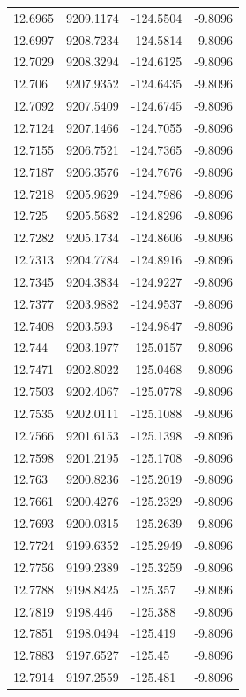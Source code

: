 \begin{table}[H]
\begin{tabular}{llll}
12.6965 & 9209.1174 & -124.5504 & -9.8096 \\
12.6997 & 9208.7234 & -124.5814 & -9.8096 \\
12.7029 & 9208.3294 & -124.6125 & -9.8096 \\
12.706 & 9207.9352 & -124.6435 & -9.8096 \\
12.7092 & 9207.5409 & -124.6745 & -9.8096 \\
12.7124 & 9207.1466 & -124.7055 & -9.8096 \\
12.7155 & 9206.7521 & -124.7365 & -9.8096 \\
12.7187 & 9206.3576 & -124.7676 & -9.8096 \\
12.7218 & 9205.9629 & -124.7986 & -9.8096 \\
12.725 & 9205.5682 & -124.8296 & -9.8096 \\
12.7282 & 9205.1734 & -124.8606 & -9.8096 \\
12.7313 & 9204.7784 & -124.8916 & -9.8096 \\
12.7345 & 9204.3834 & -124.9227 & -9.8096 \\
12.7377 & 9203.9882 & -124.9537 & -9.8096 \\
12.7408 & 9203.593 & -124.9847 & -9.8096 \\
12.744 & 9203.1977 & -125.0157 & -9.8096 \\
12.7471 & 9202.8022 & -125.0468 & -9.8096 \\
12.7503 & 9202.4067 & -125.0778 & -9.8096 \\
12.7535 & 9202.0111 & -125.1088 & -9.8096 \\
12.7566 & 9201.6153 & -125.1398 & -9.8096 \\
12.7598 & 9201.2195 & -125.1708 & -9.8096 \\
12.763 & 9200.8236 & -125.2019 & -9.8096 \\
12.7661 & 9200.4276 & -125.2329 & -9.8096 \\
12.7693 & 9200.0315 & -125.2639 & -9.8096 \\
12.7724 & 9199.6352 & -125.2949 & -9.8096 \\
12.7756 & 9199.2389 & -125.3259 & -9.8096 \\
12.7788 & 9198.8425 & -125.357 & -9.8096 \\
12.7819 & 9198.446 & -125.388 & -9.8096 \\
12.7851 & 9198.0494 & -125.419 & -9.8096 \\
12.7883 & 9197.6527 & -125.45 & -9.8096 \\
12.7914 & 9197.2559 & -125.481 & -9.8096 \\

\end{tabular}
\end{table}
